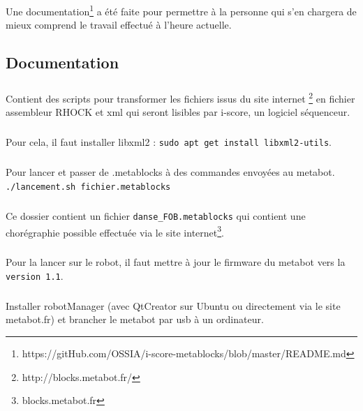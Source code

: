 \documentclass[10pt,a4paper]{report}
\begin{document}
Une documentation\footnote{https://gitHub.com/OSSIA/i-score-metablocks/blob/master/README.md} a été faite pour permettre à la personne qui s'en chargera de mieux comprend le travail effectué à l'heure actuelle.


\def\appendixpage{\vspace*{8cm} 
\begin{center} 
\Huge\textbf{Annexes} 
\end{center} 
} 
\def\appendixname{Annexe}%

\begin{appendices} 
\chapter{Documentation} 
\paragraph{}
Contient des scripts pour transformer les fichiers issus du site internet \footnote{http://blocks.metabot.fr/} en fichier assembleur RHOCK et xml qui seront lisibles par i-score, un logiciel séquenceur.
\paragraph{}
Pour cela, il faut installer libxml2 : 
\texttt{sudo apt get install libxml2-utils}.
\paragraph{}
Pour lancer et passer de .metablocks à des commandes envoyées au metabot.
\texttt{./lancement.sh fichier.metablocks}
\paragraph{}
Ce dossier contient un fichier \texttt{danse\_FOB.metablocks} qui contient une chorégraphie possible effectuée via le site internet\footnote{blocks.metabot.fr}.
\paragraph{}
Pour la lancer sur le robot, il faut mettre à jour le firmware du metabot vers la \texttt{version 1.1}.
\paragraph{}
Installer robotManager (avec QtCreator sur Ubuntu ou directement via le site metabot.fr) et brancher le metabot par usb à un ordinateur.

\end{appendices}
\end{document}
